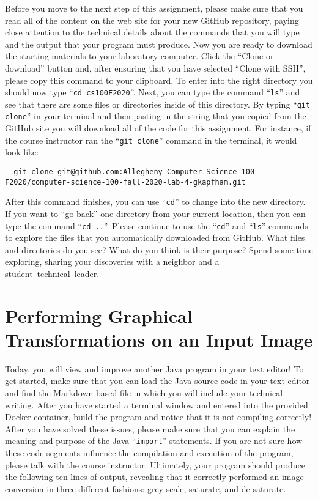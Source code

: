 \documentclass[11pt]{article}
\newcommand{\command}[1]{``\lstinline{#1}''}
\newcommand{\step}[1]{``{#1}''}
\begin{document}
Before you move to the next step of this assignment, please make sure that you
read all of the content on the web site for your new GitHub repository, paying
close attention to the technical details about the commands that you will type
and the output that your program must produce. Now you are ready to download the
starting materials to your laboratory computer. Click the ``Clone or download''
button and, after ensuring that you have selected ``Clone with SSH'', please
copy this command to your clipboard. To enter into the right directory you
should now type \command{cd cs100F2020}. Next, you can type the command
\command{ls} and see that there are some files or directories inside of this
directory. By typing \command{git clone} in your terminal and then pasting in
the string that you copied from the GitHub site you will download all of the
code for this assignment. For instance, if the course instructor ran the
\command{git clone} command in the terminal, it would look like:

\begin{lstlisting}
  git clone git@github.com:Allegheny-Computer-Science-100-F2020/computer-science-100-fall-2020-lab-4-gkapfham.git
\end{lstlisting}

After this command finishes, you can use \command{cd} to change into the new
directory. If you want to \step{go back} one directory from your current
location, then you can type the command \command{cd ..}. Please continue to use
the \command{cd} and \command{ls} commands to explore the files that you
automatically downloaded from GitHub. What files and directories do you see?
What do you think is their purpose? Spend some time exploring, sharing your
discoveries with a neighbor and a \mbox{student technical leader}.

\section*{Performing Graphical Transformations on an Input Image}

Today, you will view and improve another Java program in your text editor! To
get started, make sure that you can load the Java source code in your text
editor and find the Markdown-based file in which you will include your technical
writing. After you have started a terminal window and entered into the provided
Docker container, build the program and notice that it is not compiling
correctly! After you have solved these issues, please make sure that you can
explain the meaning and purpose of the Java \command{import} statements. If you
are not sure how these code segments influence the compilation and execution of
the program, please talk with the course instructor. Ultimately, your program
should produce the following ten lines of output, revealing that it correctly
performed an image conversion in three different fashions: grey-scale, saturate,
and de-saturate.
\end{document}
